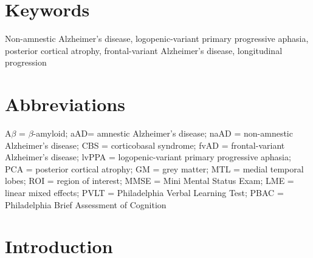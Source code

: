 \documentclass[]{article}
\begin{document}
\section*{Keywords}\label{keywords}

Non-amnestic Alzheimer's disease, logopenic-variant primary progressive
aphasia, posterior cortical atrophy, frontal-variant Alzheimer's
disease, longitudinal progression

\section*{Abbreviations}\label{abbreviations}

A\(\beta\) = \(\beta\)-amyloid; aAD= amnestic Alzheimer's disease; naAD
= non-amnestic Alzheimer's disease; CBS = corticobasal syndrome; fvAD =
frontal-variant Alzheimer's disease; lvPPA = logopenic-variant primary
progressive aphasia; PCA = posterior cortical atrophy; GM = grey matter;
MTL = medial temporal lobes; ROI = region of interest; MMSE = Mini
Mental Status Exam; LME = linear mixed effects; PVLT = Philadelphia
Verbal Learning Test; PBAC = Philadelphia Brief Assessment of Cognition

\newpage

\section*{Introduction}\label{introduction}
\end{document}
